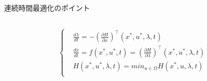 \documentclass[twocolumn, dvipdfmx,12pt]{beamer}
\begin{document}
\begin{frame}{連続時間最適化のポイント}
\begin{columns}
\begin{column}{0.45\textwidth}
\begin{align*}
\begin{cases}
                        &\frac{d\lambda}{dt}=-\left(\frac{\partial H}{\partial x}\right)^\top(x^*, u^*, \lambda, t)\\
                        &\frac{dx}{dt}=f(x^*,u^*,t)=\left(\frac{\partial H}{\partial \lambda}\right)^\top(x^*, u^*, \lambda, t) \\
                        &H(x^*, u^*, \lambda, t)=min _{u \in \Omega}H(x^*, u, \lambda, t)\\
                    \end{cases}
                \end{align*}
            \end{column}
        \end{columns}
    \end{frame}
\end{document}
